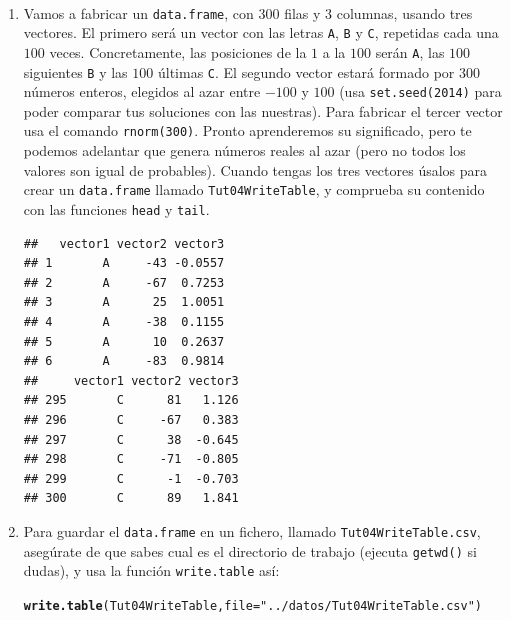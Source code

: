 \documentclass[10pt,a4paper]{article}\usepackage[]{graphicx}\usepackage[]{color}
\makeatletter
\newcommand{\hlstr}[1]{\textcolor[rgb]{0.192,0.494,0.8}{#1}}%
\newcommand{\hlstd}[1]{\textcolor[rgb]{0.345,0.345,0.345}{#1}}%
\newcommand{\hlkwc}[1]{\textcolor[rgb]{0.333,0.667,0.333}{#1}}%
\newcommand{\hlkwd}[1]{\textcolor[rgb]{0.737,0.353,0.396}{\textbf{#1}}}%
\newenvironment{kframe}{%
 \def\at@end@of@kframe{}%
 \ifinner\ifhmode%
  \def\at@end@of@kframe{\end{minipage}}%
  \begin{minipage}{\columnwidth}%
 \fi\fi%
 \def\FrameCommand##1{\hskip\@totalleftmargin \hskip-\fboxsep
 \colorbox{shadecolor}{##1}\hskip-\fboxsep
     \hskip-\linewidth \hskip-\@totalleftmargin \hskip\columnwidth}%
 \MakeFramed {\advance\hsize-\width
   \@totalleftmargin\z@ \linewidth\hsize
   \@setminipage}}%
 {\par\unskip\endMakeFramed%
 \at@end@of@kframe}
\newenvironment{knitrout}{}{} %
\newcounter {cont01}
\makeatother
\begin{document}
\begin{ejercicio}
\label{tut04:ejercicio05}
\quad\\
\begin{enumerate}
  \item Vamos a fabricar un {\tt data.frame}, con $300$ filas y $3$ columnas, usando tres vectores. El primero será un vector con las letras {\tt A}, {\tt B} y {\tt C}, repetidas cada una $100$ veces. Concretamente, las posiciones de la $1$ a la $100$ serán {\tt A}, las $100$ siguientes {\tt B} y las $100$ últimas {\tt C}. El segundo vector estará formado por $300$ números enteros, elegidos al azar entre $-100$ y $100$ (usa {\tt set.seed(2014)} para poder comparar tus soluciones con las nuestras). Para fabricar el tercer vector usa el comando {\tt rnorm(300)}. Pronto aprenderemos su significado, pero te podemos adelantar que genera números reales al azar (pero no todos los valores son igual de probables). Cuando tengas los tres vectores úsalos para crear un {\tt data.frame} llamado {\tt Tut04WriteTable}, y comprueba su contenido con las funciones {\tt head} y {\tt tail}.\\
\begin{knitrout}
\color{fgcolor}\begin{kframe}
\begin{verbatim}
##   vector1 vector2 vector3
## 1       A     -43 -0.0557
## 2       A     -67  0.7253
## 3       A      25  1.0051
## 4       A     -38  0.1155
## 5       A      10  0.2637
## 6       A     -83  0.9814
##     vector1 vector2 vector3
## 295       C      81   1.126
## 296       C     -67   0.383
## 297       C      38  -0.645
## 298       C     -71  -0.805
## 299       C      -1  -0.703
## 300       C      89   1.841
\end{verbatim}
\end{kframe}
\end{knitrout}
  \item Para guardar el {\tt data.frame} en un fichero, llamado {\tt Tut04WriteTable.csv}, asegúrate de que sabes cual es el directorio de trabajo (ejecuta {\tt getwd()} si dudas), y usa la función {\tt write.table} así:
\begin{knitrout}
\color{fgcolor}\begin{kframe}
\begin{alltt}
  \hlkwd{write.table}\hlstd{(Tut04WriteTable,} \hlkwc{file}\hlstd{=}\hlstr{"../datos/Tut04WriteTable.csv"}\hlstd{)}
\end{alltt}

\end{kframe}
\end{knitrout}
\end{enumerate}
\end{ejercicio}
\end{document}
